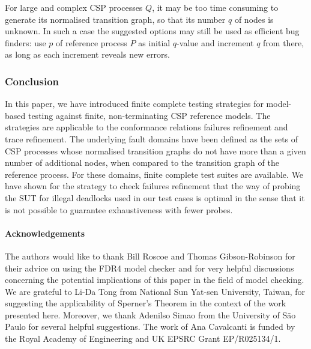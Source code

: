 For large and complex CSP processes $Q$, it may be too time consuming to
generate its normalised transition graph, so that its number $q$ of nodes is
unknown. In such a case the suggested options may still be used as efficient
bug finders: use  $p$ of reference process $P$ as initial $q$-value and
increment $q$ from there, as long as each increment reveals new errors.

\subsubsection*{Conclusion}

In this paper, we have introduced finite complete testing strategies for
model-based testing against finite, non-terminating CSP reference models. The
strategies are applicable to the conformance relations failures refinement
and trace refinement. The underlying fault domains have been defined as the
sets of CSP processes whose normalised transition graphs do not have more
than a given number of additional nodes, when compared to the transition
graph of the reference process. For these domains, finite complete test
suites are available. We have shown for the strategy to check failures
refinement that the way of probing the SUT for illegal deadlocks used in our
test cases is optimal in the sense that it is not possible to guarantee
exhaustiveness with fewer probes.


\paragraph{Acknowledgements}
The authors would like to thank Bill Roscoe and Thomas Gibson-Robinson for
their advice on using the FDR4 model checker and for very helpful discussions
concerning the potential implications of this paper in the field of model
checking. We are
grateful to Li-Da Tong from National Sun Yat-sen University, Taiwan, for
suggesting the applicability of Sperner's Theorem in the context of the work
presented here. Moreover, we thank Adenilso Simao from the University of S{\~a}o Paulo
for several helpful suggestions. 
The work of Ana Cavalcanti is funded by the Royal Academy of
Engineering and UK EPSRC Grant EP/R025134/1.

